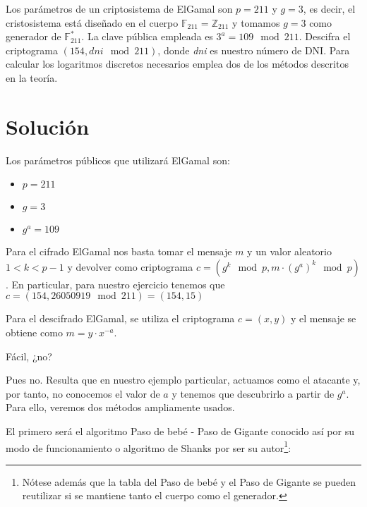 	Los parámetros  de un criptosistema de ElGamal son $p = 211$ y $g = 3$, es decir, el cristosistema está
	diseñado en el cuerpo $\mathbb{F}_{211} = \mathbb{Z}_{211}$ y tomamos $g = 3$ como generador de
	$\mathbb{F}^*_{211}$. La clave pública empleada es $3^a = 109  \mod 211$. Descifra el criptograma
	$(154, \textit{dni} \mod 211)$, donde \textit{dni} es nuestro número de DNI. Para calcular los logaritmos
	discretos necesarios emplea dos de los métodos descritos en la teoría.
\section*{Solución}
	Los parámetros públicos que utilizará ElGamal son:
	\begin{itemize}
		\item $p = 211$
		\item $g = 3$
		\item $g^a = 109$
	\end{itemize}
	
	Para el cifrado ElGamal nos basta tomar el mensaje $m$ y un valor aleatorio $1 < k < p-1$ y devolver como
	criptograma $c = \left(g^k \mod p, m \cdot \left(g^a\right)^k \mod p\right)$. En particular, para nuestro
	ejercicio tenemos que $c = (154, 26050919 \mod 211) = (154, 15)$
	
	Para el descifrado ElGamal, se utiliza el criptograma $c = \left(x, y\right)$ y el mensaje se obtiene como
	$m = y \cdot x^{-a}$.
	
	Fácil, ¿no?
	
	Pues no. Resulta que en nuestro ejemplo particular, actuamos como el atacante y, por tanto, no conocemos el
	valor de $a$ y tenemos que descubrirlo a partir de $g^a$. Para ello, veremos dos métodos ampliamente usados.
	
	El primero será el algoritmo Paso de bebé - Paso de Gigante conocido así por su modo de funcionamiento o
	algoritmo de Shanks por ser su autor\footnote{Nótese además que la tabla del Paso de bebé y el Paso de Gigante
	se pueden reutilizar si se mantiene tanto el cuerpo como el generador.}:
	
